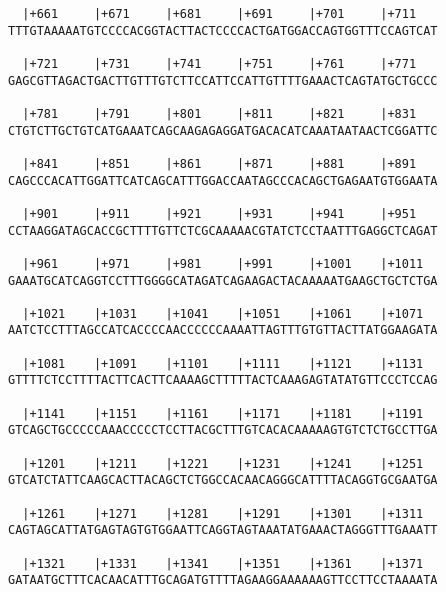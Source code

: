 \documentclass{article}
\begin{document}
{\begin{Verbatim}
  |+661     |+671     |+681     |+691     |+701     |+711   
TTTGTAAAAATGTCCCCACGGTACTTACTCCCCACTGATGGACCAGTGGTTTCCAGTCAT
                                                            
  |+721     |+731     |+741     |+751     |+761     |+771   
GAGCGTTAGACTGACTTGTTTGTCTTCCATTCCATTGTTTTGAAACTCAGTATGCTGCCC
                                                            
  |+781     |+791     |+801     |+811     |+821     |+831   
CTGTCTTGCTGTCATGAAATCAGCAAGAGAGGATGACACATCAAATAATAACTCGGATTC
                                                            
  |+841     |+851     |+861     |+871     |+881     |+891   
CAGCCCACATTGGATTCATCAGCATTTGGACCAATAGCCCACAGCTGAGAATGTGGAATA
                                                            
  |+901     |+911     |+921     |+931     |+941     |+951   
CCTAAGGATAGCACCGCTTTTGTTCTCGCAAAAACGTATCTCCTAATTTGAGGCTCAGAT
                                                            
  |+961     |+971     |+981     |+991     |+1001    |+1011  
GAAATGCATCAGGTCCTTTGGGGCATAGATCAGAAGACTACAAAAATGAAGCTGCTCTGA
                                                            
  |+1021    |+1031    |+1041    |+1051    |+1061    |+1071  
AATCTCCTTTAGCCATCACCCCAACCCCCCAAAATTAGTTTGTGTTACTTATGGAAGATA
                                                            
  |+1081    |+1091    |+1101    |+1111    |+1121    |+1131  
GTTTTCTCCTTTTACTTCACTTCAAAAGCTTTTTACTCAAAGAGTATATGTTCCCTCCAG
                                                            
  |+1141    |+1151    |+1161    |+1171    |+1181    |+1191  
GTCAGCTGCCCCCAAACCCCCTCCTTACGCTTTGTCACACAAAAAGTGTCTCTGCCTTGA
                                                            
  |+1201    |+1211    |+1221    |+1231    |+1241    |+1251  
GTCATCTATTCAAGCACTTACAGCTCTGGCCACAACAGGGCATTTTACAGGTGCGAATGA
                                                            
  |+1261    |+1271    |+1281    |+1291    |+1301    |+1311  
CAGTAGCATTATGAGTAGTGTGGAATTCAGGTAGTAAATATGAAACTAGGGTTTGAAATT
                                                            
  |+1321    |+1331    |+1341    |+1351    |+1361    |+1371  
GATAATGCTTTCACAACATTTGCAGATGTTTTAGAAGGAAAAAAGTTCCTTCCTAAAATA
                                                            

\end{Verbatim}}
\end{document}

